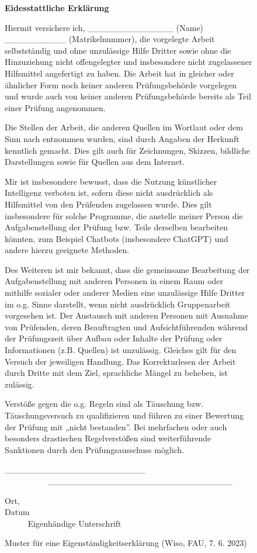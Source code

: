 \documentclass[
  letterpaper,
  DIV=11]{scrreprt}
\begin{document}
\begin{figure}

\textbf{Eidesstattliche Erklärung}

Hiermit versichere ich, \_\_\_\_\_\_\_\_\_\_\_\_\_\_ (Name)
\_\_\_\_\_\_\_\_\_\_ (Matrikelnummer), die vorgelegte Arbeit
selbstständig und ohne unzulässige Hilfe Dritter sowie ohne die
Hinzuziehung nicht offengelegter und insbesondere nicht zugelassener
Hilfsmittel angefertigt zu haben. Die Arbeit hat in gleicher oder
ähnlicher Form noch keiner anderen Prüfungsbehörde vorgelegen und wurde
auch von keiner anderen Prüfungsbehörde bereits als Teil einer Prüfung
angenommen.

Die Stellen der Arbeit, die anderen Quellen im Wortlaut oder dem Sinn
nach entnommen wurden, sind durch Angaben der Herkunft kenntlich
gemacht. Dies gilt auch für Zeichnungen, Skizzen, bildliche
Darstellungen sowie für Quellen aus dem Internet.

Mir ist insbesondere bewusst, dass die Nutzung künstlicher Intelligenz
verboten ist, sofern diese nicht ausdrücklich als Hilfsmittel von den
Prüfenden zugelassen wurde. Dies gilt insbesondere für solche Programme,
die anstelle meiner Person die Aufgabenstellung der Prüfung bzw. Teile
derselben bearbeiten könnten, zum Beispiel Chatbots (insbesondere
ChatGPT) und andere hierzu geeignete Methoden.

Des Weiteren ist mir bekannt, dass die gemeinsame Bearbeitung der
Aufgabenstellung mit anderen Personen in einem Raum oder mithilfe
sozialer oder anderer Medien eine unzulässige Hilfe Dritter im o.g.
Sinne darstellt, wenn nicht ausdrücklich Gruppenarbeit vorgesehen ist.
Der Austausch mit anderen Personen mit Ausnahme von Prüfenden, deren
Beauftragten und Aufsichtführenden während der Prüfungszeit über Aufbau
oder Inhalte der Prüfung oder Informationen (z.B. Quellen) ist
unzulässig. Gleiches gilt für den Versuch der jeweiligen Handlung. Das
Korrekturlesen der Arbeit durch Dritte mit dem Ziel, sprachliche Mängel
zu beheben, ist zulässig.

Verstöße gegen die o.g. Regeln sind als Täuschung bzw. Täuschungsversuch
zu qualifizieren und führen zu einer Bewertung der Prüfung mit „nicht
bestanden''. Bei mehrfachen oder auch besonders drastischen
Regelverstößen sind weiterführende Sanktionen durch den
Prüfungsausschuss möglich.

\_\_\_\_\_\_\_\_\_\_\_\_\_\_\_\_\_\_\_\_\_\_\_~~~~~~~~~~~~~~~~~~~~~~~~~~~~~~~~~~~~
\_\_\_\_\_\_\_\_\_\_\_\_\_\_\_\_\_\_\_\_\_\_\_\_\_\_\_\_\_\_

Ort, Datum~~~~~~~~~~~~~~~~~~~~~~~~~~~~~~~~~~~~~~~~~~~~~~~~~~~~~~~~~~~
Eigenhändige Unterschrift

\caption{\label{fig-eid}Muster für eine Eigenständigkeitserklärung
(Wiso, FAU, 7. 6. 2023)}

\end{figure}%
\end{document}
